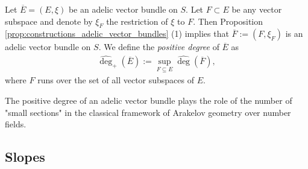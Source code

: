 \documentclass [11pt,reqno]{amsart}
\newcommand{\1}{\mathmybb{1}}
\begin{document}

\begin{definition}
\label{def:positive_degree_proper}
Let $\overline{E}=(E,\xi)$ be an adelic vector bundle on $S$. Let $F\subset E$ be any vector subspace and denote by $\xi_F$ the restriction of $\xi$ to $F$. Then Proposition \ref{prop:constructions_adelic_vector_bundles} (1) implies that $\overline{F}:=(F,\xi_F)$ is an adelic vector bundle on $S$. We define the \emph{positive degree} of $\overline{E}$ as 
\begin{align*}
\widehat{\deg}_{+}(\overline{E}) := \displaystyle\sup_{F\subseteq E} \widehat{\deg}(\overline{F}),
\end{align*}
where $F$ runs over the set of all vector subspaces of $E$.
\end{definition}

\begin{remark}
\label{rem:positive_degree_proper}
The positive degree of an adelic vector bundle plays the role of the number of "small sections" in the classical framework of Arakelov geometry over number fields.
\end{remark}

\subsection{Slopes}
\end{document}
